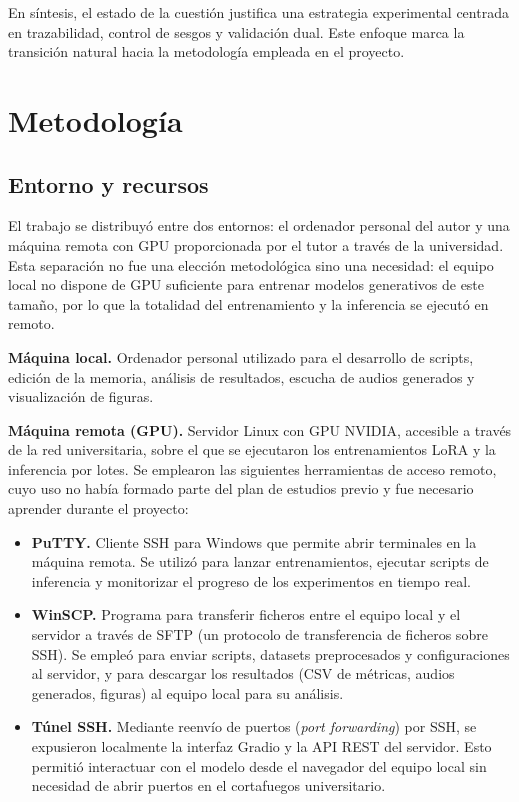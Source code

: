 \documentclass[%
    school=etsisi,%
    type=pfg,%
    degree=61CD,%
]{upm-report}
\begin{document}
En s\'intesis, el estado de la cuesti\'on justifica una estrategia experimental centrada en trazabilidad, control de sesgos y validaci\'on dual. Este enfoque marca la transici\'on natural hacia la metodolog\'ia empleada en el proyecto.

\chapter{Metodolog\'ia}
\label{ch:metodologia}

\section{Entorno y recursos}

El trabajo se distribuy\'o entre dos entornos: el ordenador personal del autor y una m\'aquina remota con GPU proporcionada por el tutor a trav\'es de la universidad. Esta separaci\'on no fue una elecci\'on metodol\'ogica sino una necesidad: el equipo local no dispone de GPU suficiente para entrenar modelos generativos de este tama\~no, por lo que la totalidad del entrenamiento y la inferencia se ejecut\'o en remoto.

\textbf{M\'aquina local.} Ordenador personal utilizado para el desarrollo de scripts, edici\'on de la memoria, an\'alisis de resultados, escucha de audios generados y visualizaci\'on de figuras.

\textbf{M\'aquina remota (GPU).} Servidor Linux con GPU NVIDIA, accesible a trav\'es de la red universitaria, sobre el que se ejecutaron los entrenamientos LoRA y la inferencia por lotes. Se emplearon las siguientes herramientas de acceso remoto, cuyo uso no hab\'ia formado parte del plan de estudios previo y fue necesario aprender durante el proyecto:

\begin{itemize}
    \item \textbf{PuTTY.} Cliente SSH para Windows que permite abrir terminales en la m\'aquina remota. Se utiliz\'o para lanzar entrenamientos, ejecutar scripts de inferencia y monitorizar el progreso de los experimentos en tiempo real.
    \item \textbf{WinSCP.} Programa para transferir ficheros entre el equipo local y el servidor a trav\'es de SFTP (un protocolo de transferencia de ficheros sobre SSH). Se emple\'o para enviar scripts, datasets preprocesados y configuraciones al servidor, y para descargar los resultados (CSV de m\'etricas, audios generados, figuras) al equipo local para su an\'alisis.
    \item \textbf{T\'unel SSH.} Mediante reenv\'io de puertos (\textit{port forwarding}) por SSH, se expusieron localmente la interfaz Gradio y la API REST del servidor. Esto permiti\'o interactuar con el modelo desde el navegador del equipo local sin necesidad de abrir puertos en el cortafuegos universitario.
\end{itemize}
\end{document}
